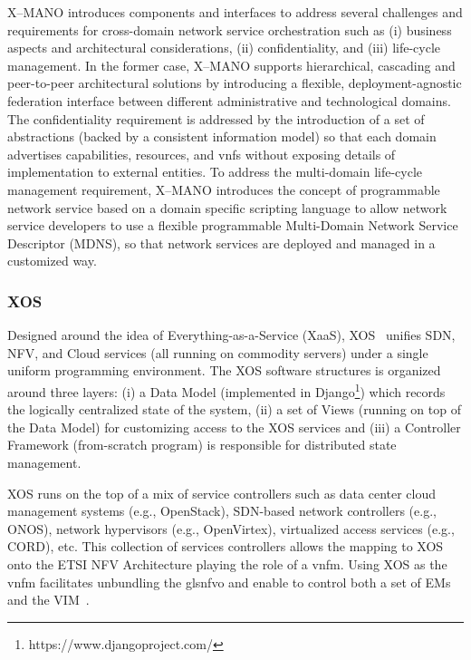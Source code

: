 X--MANO introduces components and interfaces to address several challenges and requirements for cross-domain network service orchestration such as (i) business aspects and architectural considerations, (ii) confidentiality, and (iii) life-cycle management. In the former case,  X--MANO supports hierarchical, cascading and peer-to-peer architectural solutions by introducing a flexible, deployment-agnostic federation interface between different administrative and technological domains. The confidentiality requirement is addressed by the introduction of a set of abstractions (backed by a consistent information model) so that each domain advertises capabilities, resources, and \glspl{vnf} without exposing details of implementation to external entities. To address the multi-domain life-cycle management requirement, X--MANO introduces the concept of programmable network service based on a domain specific scripting language to allow network service developers to use a flexible programmable Multi-Domain Network Service Descriptor (MDNS), so that network services are deployed and managed in a customized way.

\subsubsection{XOS}
Designed around the idea of Everything-as-a-Service (XaaS), XOS~\cite{peterson2015xos} unifies SDN, NFV, and Cloud services (all running on commodity servers) under a single uniform programming environment. The XOS software structures is organized around three layers: (i) a Data Model (implemented in Django\footnote{https://www.djangoproject.com/}) which records the logically centralized state of the system, (ii) a set of Views (running on top of the Data Model) for customizing access to the XOS services and (iii) a Controller Framework (from-scratch program) is responsible for distributed state management. 

XOS runs on the top of a mix of service controllers such as data center cloud management systems (e.g., OpenStack), SDN-based network controllers (e.g., ONOS), network hypervisors (e.g., OpenVirtex), virtualized access services (e.g., CORD), etc. This collection of services controllers allows the mapping to XOS onto the ETSI NFV Architecture playing the role of a \gls{vnfm}. Using XOS as the \gls{vnfm} facilitates unbundling the gls{nfvo} and enable to control both a set of EMs and the VIM~\cite{xos}.

